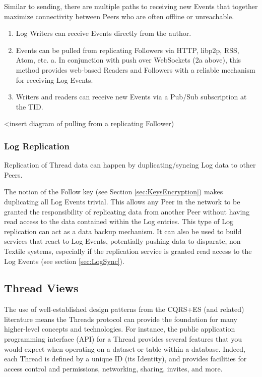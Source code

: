 \documentclass{comjnl}
\begin{document}
Similar to sending, there are multiple paths to receiving new Events that together maximize connectivity between Peers who are often offline or unreachable.

\begin{enumerate}
\item \label{Perf1}Log Writers can receive Events directly from the author.
\item \label{Perf2} Events can be pulled from replicating Followers via HTTP, libp2p, RSS, Atom, etc.
    a. In conjunction with push over WebSockets (2a above), this method provides web-based Readers and Followers with a reliable mechanism for receiving Log Events.
\item \label{Perf3} Writers and readers can receive new Events via a Pub/Sub subscription at the TID.
\end{enumerate}

<insert diagram of pulling from a replicating Follower)

\subsubsection{Log Replication}

Replication of Thread data can happen by duplicating/syncing Log data to other Peers.

The notion of the Follow key (see Section  \ref{sec:KeysEncryption}) makes duplicating all Log Events trivial. This allows any Peer in the network to be granted the responsibility of replicating data from another Peer without having read access to the data contained within the Log entries. This type of Log replication can act as a data backup mechanism. It can also be used to build services that react to Log Events, potentially pushing data to disparate, non-Textile systems, especially if the replication service is granted read access to the Log Events (see section  \ref{sec:LogSync}).

\subsection{Thread Views} \label{sec:threadviews}

The use of well-established design patterns from the CQRS+ES (and related) literature means the Threads protocol can provide the foundation for many higher-level concepts and technologies. For instance, the public application programming interface (API) for a Thread provides several features that you would expect when operating on a dataset or table within a database. Indeed, each Thread is defined by a unique ID (its Identity), and provides facilities for access control and permissions, networking, sharing, invites, and more.
\end{document}
